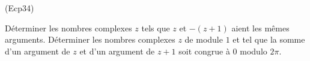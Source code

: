 \begin{tiny}(Ecp34)\end{tiny} Déterminer les nombres complexes $z$ tels que $z$ et $-(z+1)$ aient les mêmes arguments. \newline
Déterminer les nombres complexes $z$ de module $1$ et tel que la somme d'un argument de $z$ et d'un argument de $z+1$ soit congrue à $0$ modulo $2\pi$. 